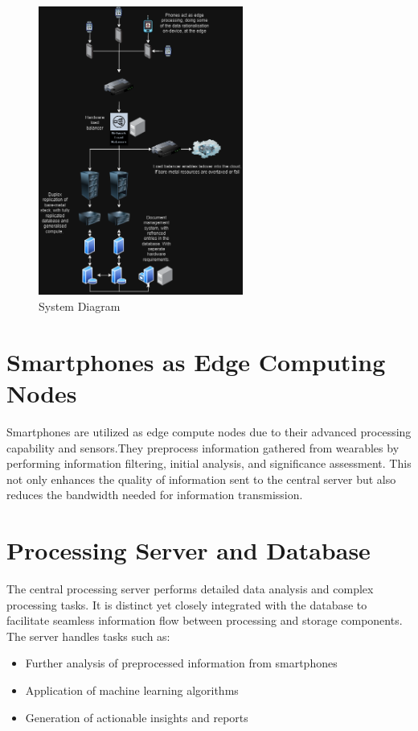 \begin{figure}[H]
    \centering
    \includegraphics[width=0.6\textwidth]{as3_diagram.drawio.png}
    \caption{System Diagram}
\end{figure}

\section{Smartphones as Edge Computing Nodes}
Smartphones are utilized as edge compute nodes due to their advanced processing
capability and sensors.They preprocess information gathered from wearables by
performing information filtering, initial analysis, and significance
assessment. This not only enhances the quality of information sent to the
central server but also reduces the bandwidth needed for information
transmission. \cite{ning2020mobile}

\section{Processing Server and Database}
The central processing server performs detailed data analysis and complex
processing tasks. It is distinct yet closely integrated with the database to
facilitate seamless information flow between processing and storage components.
The server handles tasks such as:

\begin{itemize}
    \item Further analysis of preprocessed information from smartphones
    \item Application of machine learning algorithms
    \item Generation of actionable insights and reports
\end{itemize}

